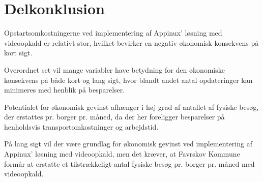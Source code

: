 \section{Delkonklusion}
Opstartsomkostningerne ved implementering af Appinux’ løsning med videoopkald er relativt stor, hvilket bevirker en negativ økonomisk konsekvens på kort sigt. 

Overordnet set vil mange variabler have betydning for den økonomiske konsekvens på både kort og lang sigt, hvor blandt andet antal opdateringer kan minimeres med henblik på besparelser. 

Potentialet for økonomisk gevinst afhænger i høj grad af antallet af fysiske besøg, der erstattes pr. borger pr. måned, da der her foreligger besparelser på henholdsvis transportomkostninger og arbejdstid.

På lang sigt vil der være grundlag for økonomisk gevinst ved implementering af Appinux’ løsning med videoopkald, men det kræver, at Favrskov Kommune formår at erstatte et tilstrækkeligt antal fysiske besøg pr. borger pr. måned med videoopkald.






